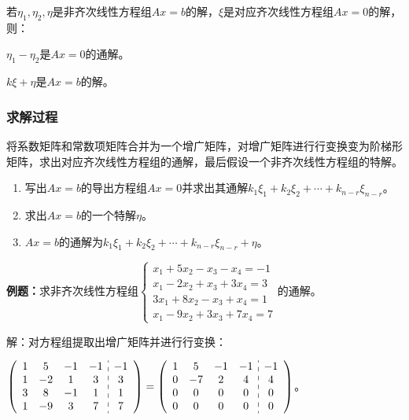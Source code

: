 若$\eta_1,\eta_2,\eta$是非齐次线性方程组$Ax=b$的解，$\xi$是对应齐次线性方程组$Ax=0$的解，则：

$\eta_1-\eta_2$是$Ax=0$的通解。

$k\xi+\eta$是$Ax=b$的解。

\subsubsection{求解过程}

将系数矩阵和常数项矩阵合并为一个增广矩阵，对增广矩阵进行行变换变为阶梯形矩阵，求出对应齐次线性方程组的通解，最后假设一个非齐次线性方程组的特解。

\begin{enumerate}
    \item 写出$Ax=b$的导出方程组$Ax=0$并求出其通解$k_1\xi_1+k_2\xi_2+\cdots+k_{n-r}\xi_{n-r}$。
    \item 求出$Ax=b$的一个特解$\eta$。
    \item $Ax=b$的通解为$k_1\xi_1+k_2\xi_2+\cdots+k_{n-r}\xi_{n-r}+\eta$。
\end{enumerate}

\textbf{例题：}求非齐次线性方程组$\left\{\begin{array}{l}
    x_1+5x_2-x_3-x_4=-1 \\
    x_1-2x_2+x_3+3x_4=3 \\
    3x_1+8x_2-x_3+x_4=1 \\
    x_1-9x_2+3x_3+7x_4=7
\end{array}\right.$的通解。

解：对方程组提取出增广矩阵并进行行变换：\medskip

$\left(\begin{array}{c:c}
    \begin{matrix}
        1 & 5 & -1 & -1 \\
        1 & -2 & 1 & 3 \\
        3 & 8 & -1 & 1 \\
        1 & -9 & 3 & 7
    \end{matrix}&
    \begin{matrix}
        -1 \\
        3 \\
        1 \\
        7
    \end{matrix}
\end{array}\right)=\left(\begin{array}{c:c}
    \begin{matrix}
        1 & 5 & -1 & -1 \\
        0 & -7 & 2 & 4 \\
        0 & 0 & 0 & 0 \\
        0 & 0 & 0 & 0
    \end{matrix}&
    \begin{matrix}
        -1 \\
        4 \\
        0 \\
        0
    \end{matrix}
\end{array}\right)$。\medskip

